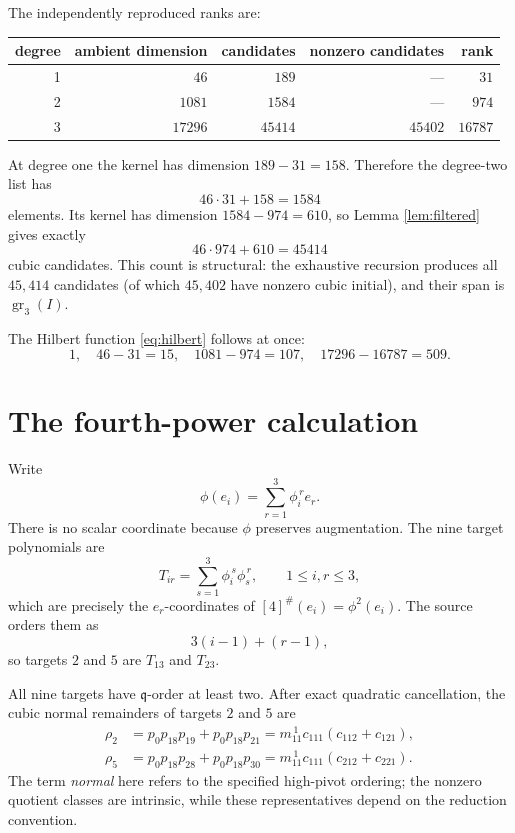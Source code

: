 \documentclass[11pt]{article}
\theoremstyle{remark}
\newcommand{\gr}{\operatorname{gr}}
\newcommand{\q}{\mathfrak q}
\begin{document}
The independently reproduced ranks are:
\begin{center}
\begin{tabular}{@{}rrrrr@{}}
\toprule
degree & ambient dimension & candidates & nonzero candidates & rank\\
\midrule
1 & \(46\)    & \(189\)   & ---      & \(31\)\\
2 & \(1081\)  & \(1584\)  & ---      & \(974\)\\
3 & \(17296\) & \(45414\) & \(45402\)& \(16787\)\\
\bottomrule
\end{tabular}
\end{center}

At degree one the kernel has dimension \(189-31=158\).  Therefore the
degree-two list has
\[
  46\cdot31+158=1584
\]
elements.  Its kernel has dimension \(1584-974=610\), so Lemma
\ref{lem:filtered} gives exactly
\[
  46\cdot974+610=45414
\]
cubic candidates.  This count is structural: the exhaustive recursion
produces all \(45{,}414\) candidates (of which \(45{,}402\) have nonzero cubic
initial), and their span is \(\gr_3(I)\).

The Hilbert function \eqref{eq:hilbert} follows at once:
\[
 1,\quad46-31=15,\quad1081-974=107,
 \quad17296-16787=509.
\]

\section{The fourth-power calculation}

Write
\[
  \phi(e_i)=\sum_{r=1}^3\phi_i^{\,r}e_r.
\]
There is no scalar coordinate because \(\phi\) preserves augmentation.  The
nine target polynomials are
\begin{equation}\label{eq:targets}
  T_{ir}=\sum_{s=1}^3\phi_i^{\,s}\phi_s^{\,r},
  \qquad1\le i,r\le3,
\end{equation}
which are precisely the \(e_r\)-coordinates of
\([4]^\#(e_i)=\phi^2(e_i)\).  The source orders them as
\[
  3(i-1)+(r-1),
\]
so targets \(2\) and \(5\) are \(T_{13}\) and \(T_{23}\).

All nine targets have \(\q\)-order at least two.  After exact quadratic
cancellation, the cubic normal remainders of targets \(2\) and \(5\) are
\begin{align}
 \rho_2
 &=p_0p_{18}p_{19}+p_0p_{18}p_{21}
   =m_{11}^{\,1}c_{111}(c_{112}+c_{121}),\label{eq:rho2}\\
 \rho_5
 &=p_0p_{18}p_{28}+p_0p_{18}p_{30}
   =m_{11}^{\,1}c_{111}(c_{212}+c_{221}).\label{eq:rho5}
\end{align}
The term \emph{normal} here refers to the specified high-pivot ordering; the
nonzero quotient classes are intrinsic, while these representatives depend
on the reduction convention.
\end{document}
